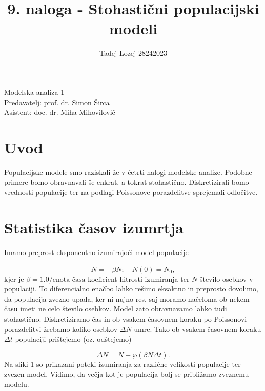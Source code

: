 \documentclass[slovene,11pt,a4paper]{article}
\begin{document}
\title{9. naloga - Stohastični populacijski modeli}
\author{Tadej Lozej 28242023}
\maketitle
\begin{center}
Modelska analiza 1 \\
\bigskip
Predavatelj: prof. dr. Simon Širca \\
Asistent: doc. dr. Miha Mihovilovič
\end{center}

\newpage

\tableofcontents

\newpage

\section{Uvod}


Populacijske modele smo raziskali že v četrti nalogi modelske analize. Podobne primere bomo obravnavali še enkrat, a tokrat stohastično. Diskretizirali bomo vrednosti populacije ter na podlagi Poissonove porazdelitve sprejemali odločitve.

\section{Statistika časov izumrtja}

Imamo preprost eksponentno izumirajoči model populacije

\begin{equation}
\dot{N} = -\beta N; \quad N(0) = N_0,
\end{equation}
kjer je $\beta = 1.0/\text{enota časa}$ koeficient hitrosti izumiranja ter $N$ število osebkov v populaciji. To diferencialno enačbo lahko rešimo eksaktno in preprosto dovolimo, da populacija zvezno upada, ker ni nujno res, saj moramo načeloma ob nekem času imeti ne celo število osebkov. Model zato obravnavamo lahko tudi stohastično. Diskretiziramo čas in ob vsakem časovnem koraku po Poissonovi porazdelitvi žrebamo koliko osebkov $\Delta N$ umre. Tako ob vsakem časovnem koraku $\Delta t$ populaciji prištejemo (oz. odštejemo)

\begin{equation}
\Delta N = N - \wp (\beta N \Delta t).
\end{equation}
Na sliki 1 so prikazani poteki izumiranja za različne velikosti populacije ter zvezen model. Vidimo, da večja kot je populacija bolj se približamo zveznemu modelu.
\end{document}
